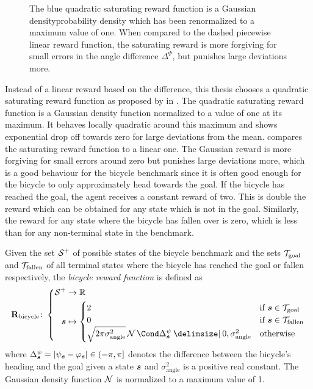 \begin{figure}[t]
    \centering
    
    \caption[Comparison of linear and saturating reward functions]{
        The blue quadratic saturating reward function is a Gaussian densityprobability density which has been renormalized to a maximum value of one.
        When compared to the dashed piecewise linear reward function, the saturating reward is more forgiving for small errors in the angle difference $\Delta^\Psi$, but punishes large deviations more.
    }
    \label{fig:saturating_reward}
\end{figure}
Instead of a linear reward based on the difference, this thesis chooses a quadratic saturating reward function as proposed by \citeauthor*{deisenroth_gaussian_2015} in \cite{deisenroth_gaussian_2015}.
The quadratic saturating reward function is a Gaussian density function normalized to a value of one at its maximum.
It behaves locally quadratic around this maximum and shows exponential drop off towards zero for large deviations from the mean.
 compares the saturating reward function to a linear one.
The Gaussian reward is more forgiving for small errors around zero but punishes large deviations more, which is a good behaviour for the bicycle benchmark since it is often good enough for the bicycle to only approximately head towards the goal.
If the bicycle has reached the goal, the agent receives a constant reward of two.
This is double the reward which can be obtained for any state which is not in the goal.
Similarly, the reward for any state where the bicycle has fallen over is zero, which is less than for any non-terminal state in the benchmark.

\begin{definition}
    Given the set $\mathcal{S}^+$ of possible states of the bicycle benchmark and the sets $\mathcal{T}_{\text{goal}}$ and $\mathcal{T}_{\text{fallen}}$ of all terminal states where the bicycle has reached the goal or fallen respectively, the \emph{bicycle reward function} is defined as
    \begin{align}
        \RwdBicycle \colon \left\{
            \begin{aligned}
                \Es^+ &\to \R \\
                \mat{s} &\mapsto \begin{cases}
                    2 & \text{if $\mat{s} \in \Goal$} \\
                    0 & \text{if $\mat{s} \in \Fallen$} \\
                \sqrt{2\pi\sigma_{\text{angle}}^2}\Gaussian{\Delta^\psi_{\mat{s}} \given 0, \sigma_{\text{angle}}^2} & \text{otherwise}
                \end{cases}
            \end{aligned}
        \right.
    \end{align}
    where $\Delta^\psi_{\mat{s}} = \abs{\psi_{\mat{s}} - \varphi_{\mat{s}}} \in (-\pi, \pi]$ denotes the difference between the bicycle's heading and the goal given a state $\bm{s}$ and $\sigma_{\text{angle}}^2$ is a positive real constant.
    The Gaussian density function $\operatorname{\mathcal{N}}$ is normalized to a maximum value of 1.
\end{definition}

